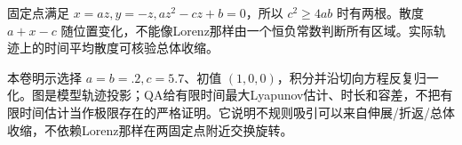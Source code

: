 固定点满足 $x=az,y=-z,az^2-cz+b=0$，所以 $c^2\ge4ab$ 时有两根。散度 $a+x-c$ 随位置变化，不能像Lorenz那样由一个恒负常数判断所有区域。实际轨迹上的时间平均散度可核验总体收缩。

本卷明示选择 $a=b=.2,c=5.7$、初值 $(1,0,0)$，积分并沿切向方程反复归一化。图是模型轨迹投影；QA给有限时间最大Lyapunov估计、时长和容差，不把有限时间估计当作极限存在的严格证明。它说明不规则吸引可以来自伸展/折返/总体收缩，不依赖Lorenz那样在两固定点附近交换旋转。
\begin{center}\end{center}
